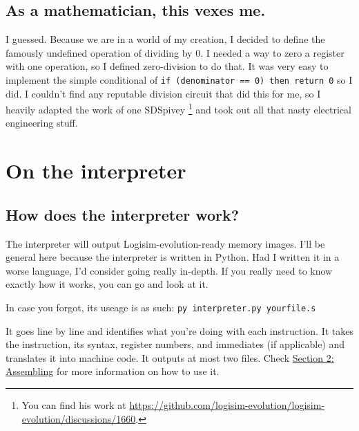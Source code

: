 \documentclass[12pt, oneside]{memoir}
\begin{document}
\section{As a mathematician, this vexes me.}
I guessed. Because we are in a world of my creation, I decided to define the famously undefined operation of dividing by 0. I needed a way to zero a register with one operation, so I defined zero-division to do that. It was very easy to implement the simple conditional of \texttt{if (denominator == 0) then return 0} so I did. I couldn't find any reputable division circuit that did this for me, so I heavily adapted the work of one SDSpivey
\footnote{You can find his work at \href{https://github.com/logisim-evolution/logisim-evolution/discussions/1660}{https://github.com/logisim-evolution/logisim-evolution/discussions/1660}.} 
and took out all that nasty electrical engineering stuff.


\chapter{On the interpreter}
\section{How does the interpreter work?}
The interpreter will output Logisim-evolution-ready memory images. I'll be general here because the interpreter is written in Python. Had I written it in a worse language, I'd consider going really in-depth. If you really need to know exactly how it works, you can go and look at it.

In case you forgot, its useage is as such: \texttt{py interpreter.py yourfile.s}

It goes line by line and identifies what you're doing with each instruction. It takes the instruction, its syntax, register numbers, and immediates (if applicable) and translates it into machine code. It outputs at most two files. Check \hyperref[s2]{Section 2: Assembling} for more information on how to use it.
\end{document}
